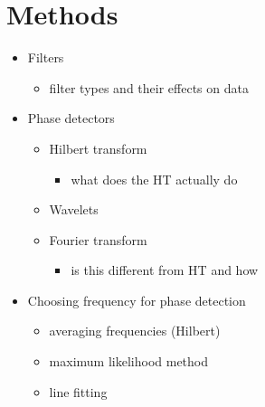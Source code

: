 \documentclass{article}
\begin{document}
\section{Methods}
\begin{itemize}
\item Filters
\begin{itemize}
\item filter types and their effects on data
\end{itemize}
\item Phase detectors
\begin{itemize}
\item Hilbert transform
\begin{itemize}
\item what does the HT actually do
\end{itemize}
\item Wavelets
\item Fourier transform
\begin{itemize}
\item is this different from HT and how
\end{itemize}
\end{itemize}
\item Choosing frequency for phase detection
\begin{itemize}
\item averaging frequencies (Hilbert)
\item maximum likelihood method
\item line fitting
\end{itemize}
\end{itemize}
\end{document}
